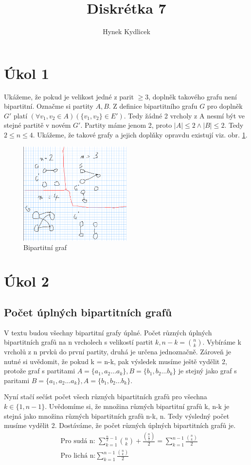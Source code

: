 \documentclass[a4paper]{article}
\author{Hynek Kydlicek}
\title{Diskrétka 7}
\begin{document}
\maketitle
\section{Úkol 1}%
Ukážeme, že pokud je velikost jedné z parit $\ge  3$, doplněk takového grafu není bipartitní.
Označme si partity $A,B$. Z definice bipartitního grafu $G$ pro doplněk $G'$ platí $(\forall v_1,v_2 \in A) (\{v_1, v_2\} \in E')$. Tedy žádné 2 vrcholy z A nesmí být ve stejné partitě v novém $G'$. Partity máme jenom 2, proto $|A| \le 2 \wedge |B| \le 2$.
Tedy $2 \le n \le  4$. Ukážeme, že takové grafy a jejich doplňky opravdu existují viz. obr. \ref{fig:bip-graf}.
\begin{figure}[htpb]
    \centering
    \includegraphics[width=0.5\textwidth]{1.png}
    \caption{Bipartitní graf}
    \label{fig:bip-graf}
\end{figure}

\section{Úkol 2}%
\subsection{Počet úplných bipartitních grafů}
V textu budou všechny bipartitní grafy úplné.
Počet různých úplných bipartitních grafů na n vrcholech s velikostí partit $k, n-k = {n\choose k}$.
Vybíráme k vrcholů z n prvků do první partity, druhá je určena jednoznačně.
Zároveň je nutné si uvědomit, že pokud k = n-k, pak výsledek musíme ještě vydělit 2, protože graf s partitami $A=\{a_1, a_2 \dots a_k\}, B = \{b_1, b_2 \dots b_k\} $ je stejný jako graf s paritami $B=\{a_1, a_2 \dots a_k\}, A = \{b_1, b_2 \dots b_k\} $.

Nyní stačí sečíst počet všech různých bipartitních grafů pro všechna $k \in \{1, n-1\}$.
Uvědomíme si, že množina různých bipartitní grafů k, n-k je stejná jako množina různých bipartitních grafů n-k, n.
Tedy výsledný počet musíme vydělit 2.
Dostáváme, že počet různých úplných bipartitních grafů je.
\begin{align*}
    &\text{Pro sudá n: }
    \sum_{k = 1}^{\frac{n}{2}-1} {n \choose k} + \frac{{n \choose \frac{n}{2}}}{2} = \sum_{k=1}^{n-1} \frac{{n \choose k}}{2}
    \\
    &\text{Pro lichá n:}
    \sum_{k=1}^{n-1} \frac{{n \choose k}}{2}
\end{align*}
\end{document}
